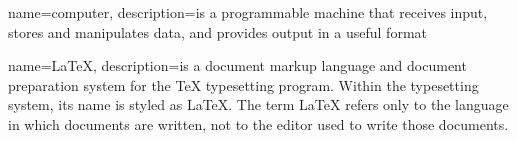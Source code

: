 
{
  name=computer,
  description={is a programmable machine that receives input,
               stores and manipulates data, and provides
               output in a useful format}
}

{
  name=\LaTeX,
  description={is a document markup language and document preparation system for the TeX typesetting program. Within the typesetting system, its name is styled as LaTeX. The term LaTeX refers only to the language in which documents are written, not to the editor used to write those documents. }
}

